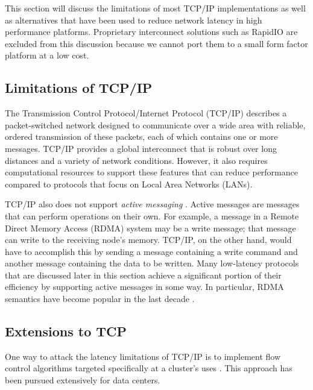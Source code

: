 \documentclass[11pt]{book}
\begin{document}
This section will discuss the limitations of most TCP/IP implementations as well as
alternatives that have been used to reduce network latency in high performance platforms.
Proprietary interconnect solutions such as RapidIO \cite{} are excluded from this
discussion because we cannot port them to a small form factor platform at a low cost.

\subsection{Limitations of TCP/IP}

The Transmission Control Protocol/Internet Protocol (TCP/IP) describes a packet-switched
network designed to communicate over a wide area with reliable, ordered transmission of
these packets, each of which contains one or more messages.  TCP/IP provides a global
interconnect that is robust over long distances and a variety of network conditions.
However, it also requires computational resources to support these features that can
reduce performance compared to protocols that focus on Local Area Networks (LANs).


TCP/IP also does not support \textit{active messaging} \cite{}.  Active messages are
messages that can perform operations on their own.  For example, a message in a Remote
Direct Memory Access (RDMA) system may be a write message; that message can write to the
receiving node's memory.  TCP/IP, on the other hand, would have to accomplish this by
sending a message containing a write command and another message containing the data to be
written.  Many low-latency protocols that are discussed later in this section achieve a
significant portion of their efficiency by supporting active messages in some way.  In
particular, RDMA semantics have become popular in the last decade \cite{}.

\subsection{Extensions to TCP}


One way to attack the latency limitations of TCP/IP is to implement flow control
algorithms targeted specifically at a cluster's uses \cite{}.  This approach has been
pursued extensively for data centers.
\end{document}
